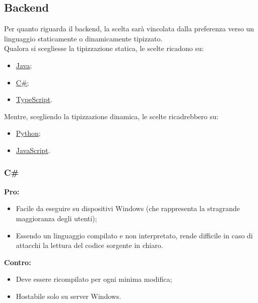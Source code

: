 \documentclass[a4paper, 12pt]{article}
\begin{document}
\subsection{Backend}
Per quanto riguarda il backend, la scelta sarà vincolata dalla preferenza verso un linguaggio staticamente o dinamicamente tipizzato. \\
Qualora si scegliesse la tipizzazione statica, le scelte ricadono su:
\begin{itemize}
    \item \href{https://www.java.com/it/}{Java};
    \item \href{https://learn.microsoft.com/en-us/dotnet/csharp/}{C\#};
    \item \href{https://www.typescriptlang.org/}{TypeScript}.
\end{itemize}
Mentre, scegliendo la tipizzazione dinamica, le scelte ricadrebbero su:
\begin{itemize}
    \item \href{https://www.python.org/}{Python};
    \item \href{https://www.javascript.com/}{JavaScript}.
\end{itemize}
\subsubsection{C\#}
\textbf{Pro:}
\begin{itemize}
    \item Facile da eseguire su dispositivi Windows (che rappresenta la stragrande maggioranza degli utenti);
    \item Essendo un linguaggio compilato e non interpretato, rende difficile in caso di attacchi la lettura del codice sorgente in chiaro.
\end{itemize}
\vspace*{0.5cm}
\textbf{Contro:}
\begin{itemize}
    \item Deve essere ricompilato per ogni minima modifica;
    \item Hostabile solo su server Windows.
\end{itemize}
\end{document}

